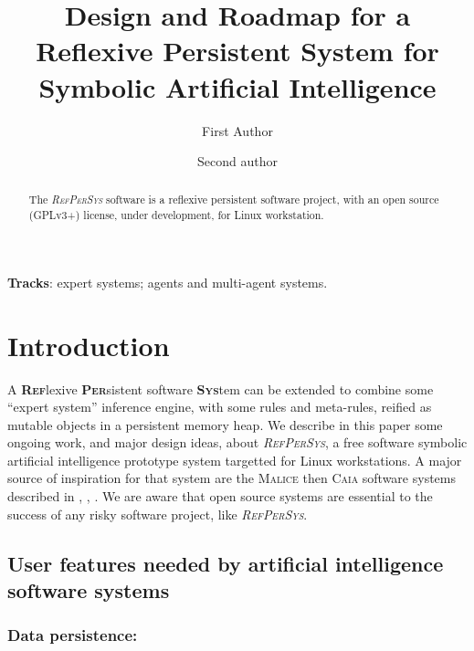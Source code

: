 \documentclass{svproc}
\begin{document}


\newcommand{\RefPerSys}[0]{{\textit{\textsc{RefPerSys}}}}

\mainmatter              %
%
\title{Design and Roadmap for a Reflexive Persistent System for
  Symbolic Artificial Intelligence} \titlerunning{\RefPerSys}
\author{First Author \and Second author} 


\maketitle

\begin{abstract}
  The \RefPerSys{} software is a reflexive persistent software
  project, with an open source (GPLv3+) license, under development,
  for Linux workstation.
\end{abstract}

\textbf{Tracks}: expert systems; agents and multi-agent systems.

\section{Introduction}

A \textsc{\textbf{Ref}}lexive \textsc{\textbf{Per}}sistent software
\textsc{\textbf{Sys}}tem can be extended to combine some ``expert
system'' inference engine, with some rules and meta-rules, reified as
mutable objects in a persistent memory heap. We describe in this paper
some ongoing work, and major design ideas, about \RefPerSys, a free
software symbolic artificial intelligence prototype system targetted
for Linux workstations. A major source of inspiration for that system
are the \textsc{Malice} then \textsc{Caia} software systems described
in \cite{Pitrat:1996:FGCS}, \cite{Pitrat:2009:AST},
\cite{Pitrat:2009:ArtifBeings}. We are aware that open source systems
\cite{Weber:2004:SuccessOpenSource} are essential to the success of
any risky software project, like \RefPerSys.

\subsection{User features needed by artificial intelligence software systems}

\subsubsection{Data persistence:}
\end{document}
